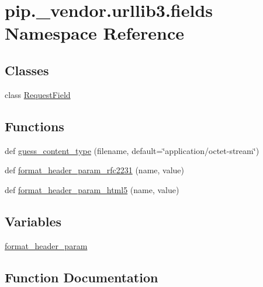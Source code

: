 \hypertarget{namespacepip_1_1__vendor_1_1urllib3_1_1fields}{}\section{pip.\+\_\+vendor.\+urllib3.\+fields Namespace Reference}
\label{namespacepip_1_1__vendor_1_1urllib3_1_1fields}
\subsection*{Classes}
\begin{DoxyCompactItemize}
\item 
class \hyperlink{classpip_1_1__vendor_1_1urllib3_1_1fields_1_1RequestField}{Request\+Field}
\end{DoxyCompactItemize}
\subsection*{Functions}
\begin{DoxyCompactItemize}
\item 
def \hyperlink{namespacepip_1_1__vendor_1_1urllib3_1_1fields_a70ea8eadc6184dbba7b43f84471307a6}{guess\+\_\+content\+\_\+type} (filename, default=\char`\"{}application/octet-\/stream\char`\"{})
\item 
def \hyperlink{namespacepip_1_1__vendor_1_1urllib3_1_1fields_a2c332345c140f63acb8b1ce81f0ead61}{format\+\_\+header\+\_\+param\+\_\+rfc2231} (name, value)
\item 
def \hyperlink{namespacepip_1_1__vendor_1_1urllib3_1_1fields_a969066e8f71fd6c85bcfa7d6a81752a0}{format\+\_\+header\+\_\+param\+\_\+html5} (name, value)
\end{DoxyCompactItemize}
\subsection*{Variables}
\begin{DoxyCompactItemize}
\item 
\hyperlink{namespacepip_1_1__vendor_1_1urllib3_1_1fields_a70f74bb977787712470e278b7183fe8e}{format\+\_\+header\+\_\+param}
\end{DoxyCompactItemize}


\subsection{Function Documentation}
\mbox{\label{namespacepip_1_1__vendor_1_1urllib3_1_1fields_a969066e8f71fd6c85bcfa7d6a81752a0}} 
